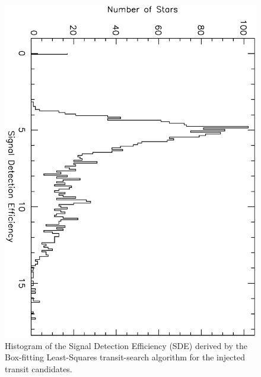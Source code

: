 \begin{figure}
\begin{center}
\centering
\includegraphics[width=.75\textwidth, angle=90]{7_comp_f}
\caption[Histogram of SDEs for BLS-recovered transit candidates]{%
Histogram of the Signal Detection Efficiency (SDE) derived by the Box-fitting Least-Squares transit-search algorithm for the injected transit candidates.%
}\label{cha:human:sec:model:fig:histsderec}
\end{center}
\end{figure}
